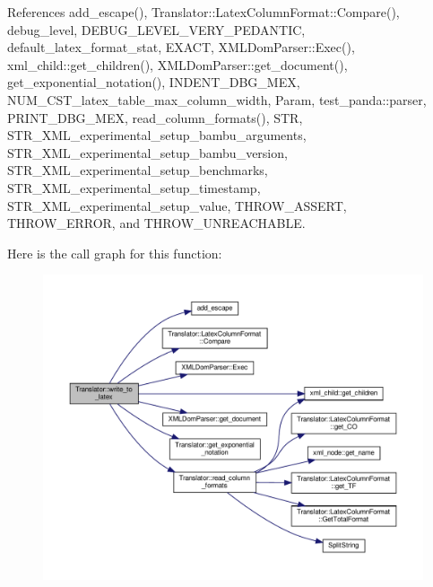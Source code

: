 References add\+\_\+escape(), Translator\+::\+Latex\+Column\+Format\+::\+Compare(), debug\+\_\+level, D\+E\+B\+U\+G\+\_\+\+L\+E\+V\+E\+L\+\_\+\+V\+E\+R\+Y\+\_\+\+P\+E\+D\+A\+N\+T\+IC, default\+\_\+latex\+\_\+format\+\_\+stat, E\+X\+A\+CT, X\+M\+L\+Dom\+Parser\+::\+Exec(), xml\+\_\+child\+::get\+\_\+children(), X\+M\+L\+Dom\+Parser\+::get\+\_\+document(), get\+\_\+exponential\+\_\+notation(), I\+N\+D\+E\+N\+T\+\_\+\+D\+B\+G\+\_\+\+M\+EX, N\+U\+M\+\_\+\+C\+S\+T\+\_\+latex\+\_\+table\+\_\+max\+\_\+column\+\_\+width, Param, test\+\_\+panda\+::parser, P\+R\+I\+N\+T\+\_\+\+D\+B\+G\+\_\+\+M\+EX, read\+\_\+column\+\_\+formats(), S\+TR, S\+T\+R\+\_\+\+X\+M\+L\+\_\+experimental\+\_\+setup\+\_\+bambu\+\_\+arguments, S\+T\+R\+\_\+\+X\+M\+L\+\_\+experimental\+\_\+setup\+\_\+bambu\+\_\+version, S\+T\+R\+\_\+\+X\+M\+L\+\_\+experimental\+\_\+setup\+\_\+benchmarks, S\+T\+R\+\_\+\+X\+M\+L\+\_\+experimental\+\_\+setup\+\_\+timestamp, S\+T\+R\+\_\+\+X\+M\+L\+\_\+experimental\+\_\+setup\+\_\+value, T\+H\+R\+O\+W\+\_\+\+A\+S\+S\+E\+RT, T\+H\+R\+O\+W\+\_\+\+E\+R\+R\+OR, and T\+H\+R\+O\+W\+\_\+\+U\+N\+R\+E\+A\+C\+H\+A\+B\+LE.

Here is the call graph for this function\+:
\nopagebreak
\begin{figure}[H]
\begin{center}
\leavevmode
\includegraphics[width=350pt]{d4/dee/classTranslator_a6194c4b18e48988d4785f172d58565aa_cgraph}
\end{center}
\end{figure}
\mbox{\label{classTranslator_a951eb4e033f27de62cd98dbb9dd23f52}} 
